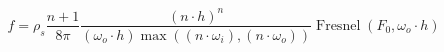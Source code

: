 \begin{equation}
    f = \rho_{s}\frac{n+1}{8\pi}
        \frac{({n}\cdot{h})^n}
             {(\omega_{o}\cdot{h})
               \max(({n}\cdot\omega_{i}),
                   ({n}\cdot\omega_{o}))}
        \operatorname{Fresnel}(F_{0},\omega_{o}\cdot{h})
\end{equation}